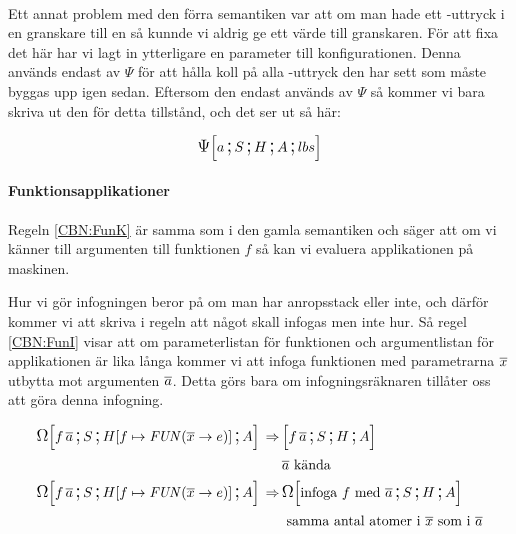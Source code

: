 \documentclass[../Optimise]{subfiles}
\begin{document}
\paragraph{}

Ett annat problem med den förra semantiken var att om man hade ett -uttryck
i en granskare till en  så kunnde vi aldrig ge ett värde till granskaren.
För att fixa det här har vi lagt in ytterligare en parameter till konfigurationen.
Denna används endast av $\Psi$ för att hålla koll på alla -uttryck den har sett
som måste byggas upp igen sedan. Eftersom den endast används av $\Psi$ så kommer vi
bara skriva ut den för detta tillstånd, och det ser ut så här:

\[
\CBNPSI SHA{lbs}a
\]

\begin{comment}
En annan ändring är att $\Psi$ numera tar en atom istället för en variabel
eftersom det inte bara är variabler som kan vara värden. Detta var en detalj
som missades i CBV-semantiken men som nu har rättats till.
\end{comment}

\paragraph{Funktionsapplikationer}
Regeln \eqref{CBN:FunK} är samma som i den gamla semantiken och säger att om vi känner till
argumenten till funktionen $f$ så kan vi evaluera applikationen på maskinen. 

Hur vi gör infogningen beror på om man har anropsstack eller inte, och därför kommer vi
att skriva i regeln att något skall infogas men inte hur. Så regel \eqref{CBN:FunI}
visar att om parameterlistan för funktionen och argumentlistan för applikationen är
lika långa kommer vi att infoga funktionen med parametrarna $\many{x}$ utbytta mot
argumenten $\many{a}$. Detta görs bara om infogningsräknaren tillåter oss att göra 
denna infogning.


\begin{align}
\label{CBN:FunK}\CBNOMEGA S{\heap f{\FUN{\many{x}}{e}}}A{f \, \many{a}} \rulesep & \CBNMC {f \, \many{a}}SHA \\
 & \many{a} \text{ kända } \nonumber \\
\label{CBN:FunI}\CBNOMEGA S{\heap f{\FUN{\many{x}}e}}A{f\, \many{a}} \rulesep & \CBNOMEGA SHA{\text{infoga } f \text{ med } \many{a}} \\
 & \text{ samma antal atomer i } \many{x} \text{ som i } \many{a} \nonumber
\end{align}
\end{document}
